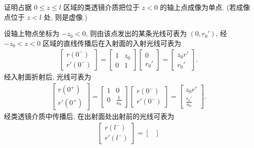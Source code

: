 \documentclass{note}
\begin{document}
\begin{exe}
    证明占据 $0\leq z\leq l$ 区域的类透镜介质把位于 $z<0$ 的轴上点成像为单点. (若成像点位于 $z<l$ 处, 则是虚像.)
\end{exe}
\begin{pf}
    设轴上物点坐标为 $-z_0<0$, 则由该点发出的某条光线可表为 $(0,r_0')$, 经 $-z_0<z<0$ 区域的直线传播后在入射面的入射光线可表为
    \begin{align}
        \begin{bmatrix}
            r(0^-)\\
            r'(0^-)
        \end{bmatrix}=\begin{bmatrix}
            1&z_0\\
            0&1
        \end{bmatrix}\begin{bmatrix}
            0\\
            r_0'
        \end{bmatrix}=\begin{bmatrix}
            z_0r'\\
            r_0'
        \end{bmatrix}.
    \end{align}
    经入射面折射后, 光线可表为
    \begin{align}
        \begin{bmatrix}
            r(0^+)\\
            r'(0^+)
        \end{bmatrix}=\begin{bmatrix}
            1&0\\
            0&\frac{1}{n_0}
        \end{bmatrix}\begin{bmatrix}
            r(0^-)\\
            r'(0^-)
        \end{bmatrix}=\begin{bmatrix}
            z_0r'\\
            \frac{r_0'}{n_0}
        \end{bmatrix}.
    \end{align}
    经类透镜介质中传播后, 在出射面处出射前的光线可表为
    \begin{align}
        \begin{bmatrix}
            r(l^-)\\
            r'(l^-)
        \end{bmatrix}=\begin{bmatrix}

\end{bmatrix}
\end{align}
\end{pf}
\end{document}
